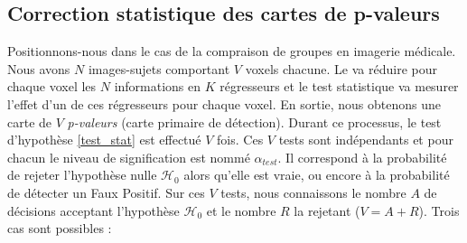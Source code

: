 \subsection{Correction statistique des cartes de p-valeurs}
Positionnons-nous dans le cas de la compraison de groupes en imagerie médicale.
Nous avons $N$ images-sujets comportant $V$ voxels chacune.
Le \mlg va réduire pour chaque voxel les $N$ informations en $K$ régresseurs et 
le test statistique va mesurer l'effet d'un de ces régresseurs pour chaque voxel.
En sortie, nous obtenons une carte de $V$ \textit{p-valeurs} (carte primaire de détection).
Durant ce processus, le test d'hypothèse \eqref{test_stat} est effectué $V$ fois.
Ces $V$ tests sont indépendants et pour chacun le niveau de signification est nommé $\alpha_{test}$. 
Il correspond à la probabilité de rejeter l'hypothèse nulle $\mathcal{H}_0$ alors qu'elle est vraie, 
ou encore à la probabilité de détecter un Faux Positif.
Sur ces $V$ tests, nous connaissons le nombre $A$ de décisions acceptant l'hypothèse $\mathcal{H}_0$ et le nombre $R$ la rejetant ($V=A+R$).
Trois cas sont possibles : \\
